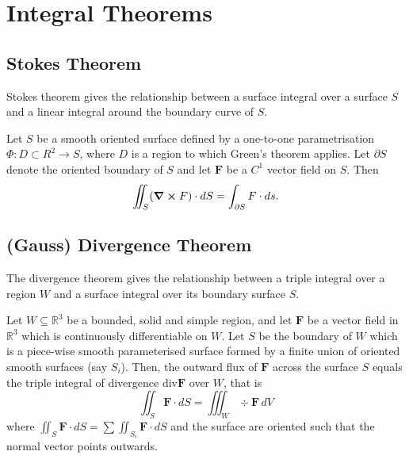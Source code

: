 \section{Integral Theorems}
\subsection{Stokes Theorem}
Stokes theorem gives the relationship between a surface integral over a  surface \(S\) and a linear integral around the boundary curve of \(S\).

Let \(S\) be a smooth oriented surface defined by a one-to-one parametrisation \(\Phi: D \subset R^2 \to S\), where \(D\) is a region to which Green's theorem applies. Let \(\partial S\) denote the oriented boundary of \(S\) and let \(\textbf{F}\) be a \(C^1\) vector field on \(S\). Then
\[\iint_S (\curl F) \cdot dS = \int_{\partial S} F \cdot ds.\]

\subsection{(Gauss) Divergence Theorem}
The divergence theorem gives the relationship between a triple integral over a region \(W\) and a surface integral over its boundary surface \(S\).

Let \(W \subseteq \mathbb R^3\) be a bounded, solid and simple region, and let \(\textbf{F}\) be a vector field in \(\mathbb R^3\) which is continuously differentiable on \(W\). Let \(S\) be the boundary of \(W\) which is a piece-wise smooth parameterised surface formed by a finite union of oriented smooth surfaces (say \(S_i\)). Then, the outward flux of \(\textbf{F}\) across the surface \(S\) equals the triple integral of divergence div\(\textbf{F}\) over \(W\), that is 
\[\iint_S \textbf{F} \cdot dS = \iiint_W \div \textbf{F} \, dV\]
where \(\iint_S \textbf{F} \cdot dS = \sum \iint_{S_i} \textbf{F} \cdot dS\) and the surface are oriented such that the normal vector points outwards.
